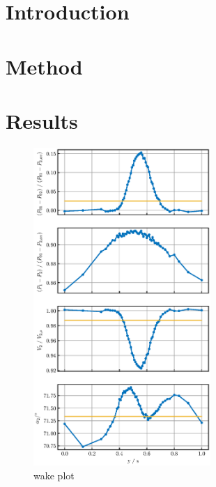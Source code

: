 \documentclass{article}
\begin{document}
\title{}
\author{lwp26}
\date{October 2024}
\maketitle 

\section{Introduction}


\section{Method}

\section{Results}


\begin{figure}[H]
    \centering
    \includegraphics[width=0.6\textwidth]{figures/wake_plot.eps}
    \caption{wake plot}
    \label{fig:wake_plot}
\end{figure}
\end{document}
